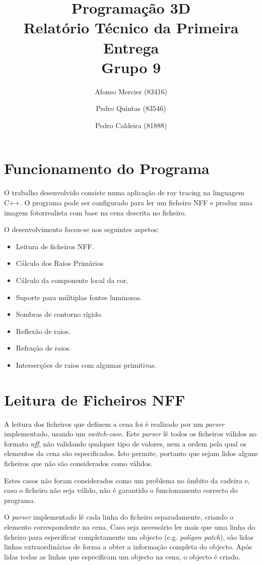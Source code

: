 \documentclass{article}
\title{
    \textbf{Programação 3D} \\
    Relatório Técnico da Primeira Entrega \\
    Grupo 9
}
\author{Afonso Mercier (83416) \and Pedro Quintas (83546) \and Pedro Caldeira (81888)}
\date{}
\begin{document}
    \maketitle

    \begin{multicols}{2}
    \section{Funcionamento do Programa}

    O trabalho desenvolvido consiste numa aplicação de ray tracing na linguagem
    C++. O programa pode ser configurado para ler um ficheiro NFF e produz uma
    imagem fotorrealista com base na cena descrita no ficheiro.

    O desenvolvimento focou-se nos seguintes aspetos:

    \begin{itemize}
        \item Leitura de ficheiros NFF.
        \item Cálculo dos Raios Primários
        \item Cálculo da componente local da cor.
        \item Suporte para múltiplas fontes luminosas.
        \item Sombras de contorno rígido.
        \item Reflexão de raios.
        \item Refração de raios.
        \item Intersecções de raios com algumas primitivas.
    \end{itemize}

    \section{Leitura de Ficheiros NFF}
    
    A leitura dos ficheiros que definem a cena foi é realizado por um \textit{parser} implementado, usando um \textit{switch-case}. Este \textit{parser} lê todos os ficheiros válidos no formato \textit{nff}, não validando qualquer tipo de valores, nem a ordem pela qual os elementos da cena são especificados. Isto permite, portanto que sejam lidos alguns ficheiros que não são considerados como válidos.\par 
    Estes casos não foram considerados como um problema no âmbito da cadeira e, caso o ficheiro não seja válido, não é garantido o funcionamento correcto do programa.\par
    O \textit{parser} implementado lê cada linha do ficheiro separadamente, criando o elemento correspondente na cena. Caso seja necessário ler mais que uma linha do ficheiro para especificar completamente um objecto (e.g. \textit{poligon patch}), são lidas linhas extraordinárias de forma a obter a informação completa do objecto. Após lidas todas as linhas que especificam um objecto na cena, o objecto é criado.
    


\end{multicols}
\end{document}
